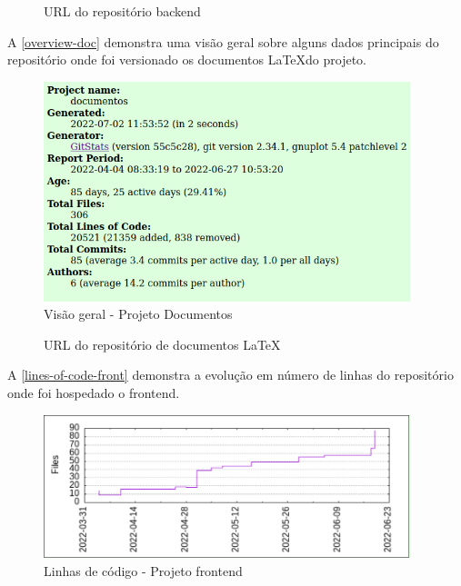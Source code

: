 \begin{figure}[htb]
	\caption{\label{qr-url-back}URL do repositório \gls{backend}}
	\begin{center}
	\end{center}
\end{figure}

A \autoref{overview-doc} demonstra uma visão geral sobre alguns dados principais do repositório onde foi versionado os documentos \LaTeX do projeto.

\begin{figure}[H]
	\centering
	\caption{\label{overview-doc}Visão geral - Projeto Documentos}
	\includegraphics[width=0.95\textwidth]{../imagens/stats/overview-documentos.png}
\end{figure}

\begin{figure}[htb]
	\caption{\label{qr-url-doc}URL do repositório de documentos \LaTeX}
	\begin{center}
	\end{center}
\end{figure}

A \autoref{lines-of-code-front} demonstra a evolução em número de linhas do repositório onde foi hospedado o \gls{frontend}.
\begin{figure}[H]
	\centering
	\caption{\label{lines-of-code-front}Linhas de código - Projeto \gls{frontend}}
	\includegraphics[width=0.95\textwidth]{../imagens/stats/lines-of-code-frontend.png}
\end{figure}

